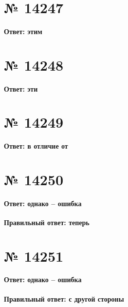 \documentclass[11pt]{article} %
\begin{document}
\section{№ \textbf{14247}}

\paragraph{Ответ: \textbf{этим}}

\section{№ \textbf{14248}}

\paragraph{Ответ: \textbf{эти}}

\section{№ \textbf{14249}}

\paragraph{Ответ: \textbf{в отличие от}}

\section{№ \textbf{14250}}

\paragraph{Ответ: однако -- ошибка}

\paragraph{Правильный ответ: \textbf{теперь}}

\section{№ \textbf{14251}}

\paragraph{Ответ: однако -- ошибка}

\paragraph{Правильный ответ: \textbf{с другой стороны}}
\end{document}
